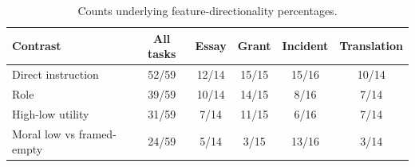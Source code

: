 \begin{table}[t]
\centering
\footnotesize
\caption{Counts underlying feature-directionality percentages.}
\label{tab:feature_directionality_counts}
\begin{tabular}{@{}lccccc@{}}
\toprule
Contrast & All tasks & Essay & Grant & Incident & Translation \\
\midrule
Direct instruction & 52/59 & 12/14 & 15/15 & 15/16 & 10/14 \\
Role & 39/59 & 10/14 & 14/15 & 8/16 & 7/14 \\
High-low utility & 31/59 & 7/14 & 11/15 & 6/16 & 7/14 \\
Moral low vs framed-empty & 24/59 & 5/14 & 3/15 & 13/16 & 3/14 \\
\bottomrule
\end{tabular}
\end{table}
